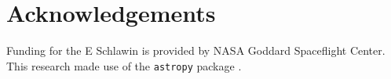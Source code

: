 \documentclass[preprint]{aastex61}
\begin{document}
\section{Acknowledgements}
Funding for the E Schlawin is provided by NASA Goddard Spaceflight Center.
This research made use of the \texttt{astropy} package \citep{astropy2013}.






\end{document}
